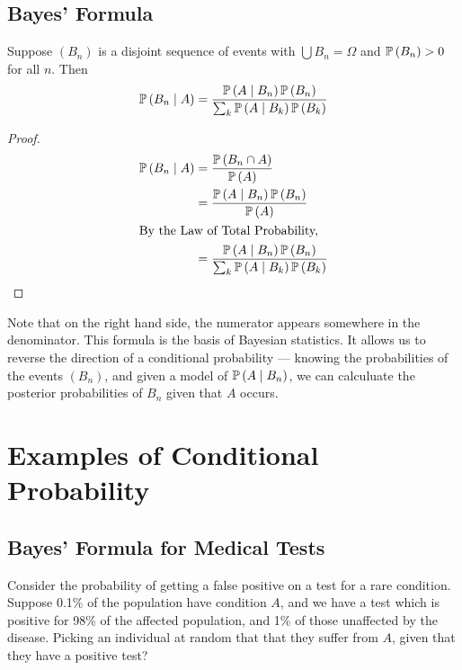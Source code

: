 \documentclass{article}
\begin{document}
\subsection{Bayes' Formula}
\begin{claim}
	Suppose $(B_n)$ is a disjoint sequence of events with $\bigcup B_n = \Omega$ and $\mathbb{P}\left({B_n}\right) > 0$ for all $n$. Then
	\[ \mathbb{P}\left({B_n \mid A}\right) = \frac{\mathbb{P}\left({A \mid B_n}\right) \mathbb{P}\left({B_n}\right)}{\sum_k \mathbb{P}\left({A \mid B_k}\right) \mathbb{P}\left({B_k}\right)} \]
\end{claim}
\begin{proof}
	\begin{align*}
		\mathbb{P}\left({B_n \mid A}\right) & = \frac{\mathbb{P}\left({B_n \cap A}\right)}{\mathbb{P}\left({A}\right)}                                       \\
		                  & = \frac{\mathbb{P}\left({A \mid B_n}\right) \mathbb{P}\left({B_n}\right)}{\mathbb{P}\left({A}\right)}                            \\
		\intertext{By the Law of Total Probability,}
		                  & = \frac{\mathbb{P}\left({A \mid B_n}\right) \mathbb{P}\left({B_n}\right)}{\sum_k \mathbb{P}\left({A \mid B_k}\right) \mathbb{P}\left({B_k}\right)}
	\end{align*}
\end{proof}
\noindent Note that on the right hand side, the numerator appears somewhere in the denominator. This formula is the basis of Bayesian statistics. It allows us to reverse the direction of a conditional probability --- knowing the probabilities of the events $(B_n)$, and given a model of $\mathbb{P}\left({A \mid B_n}\right)$, we can calculuate the posterior probabilities of $B_n$ given that $A$ occurs.

\section{Examples of Conditional Probability}
\subsection{Bayes' Formula for Medical Tests}
Consider the probability of getting a false positive on a test for a rare condition. Suppose 0.1\% of the population have condition $A$, and we have a test which is positive for 98\% of the affected population, and 1\% of those unaffected by the disease. Picking an individual at random that that they suffer from $A$, given that they have a positive test?
\end{document}
